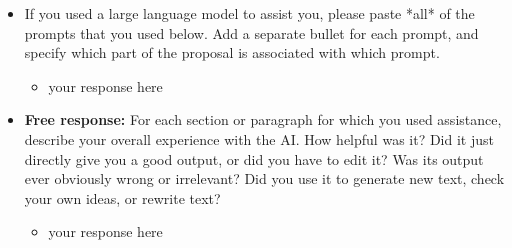 \begin{itemize}
    \item  If you used a large language model to assist you, please paste *all* of the prompts that you used below. Add a separate bullet for each prompt, and specify which part of the proposal is associated with which prompt.
    \begin{itemize}
        \item your response here
    \end{itemize}
    \item \textbf{Free response:} For each section or paragraph for which you used assistance, describe your overall experience with the AI. How helpful was it? Did it just directly give you a good output, or did you have to edit it? Was its output ever obviously wrong or irrelevant? Did you use it to generate new text, check your own ideas, or rewrite text?
    \begin{itemize}
        \item your response here
    \end{itemize}
\end{itemize}
